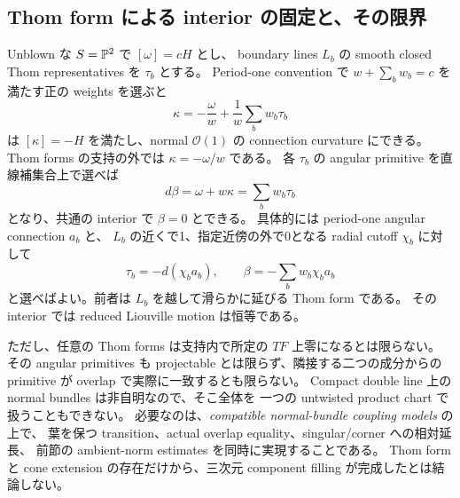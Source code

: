 \subsection{Thom form による interior の固定と、その限界}

Unblown な $S=\mathbb P^2$ で $[\omega]=cH$ とし、
boundary lines $L_b$ の smooth closed Thom representatives を $\tau_b$ とする。
Period-one convention で $w+\sum_bw_b=c$ を満たす正の weights を選ぶと
\[
\kappa=-\frac{\omega}{w}+\frac1w\sum_bw_b\tau_b
\]
は $[\kappa]=-H$ を満たし、normal $\mathcal O(1)$ の connection curvature にできる。
Thom forms の支持の外では $\kappa=-\omega/w$ である。
各 $\tau_b$ の angular primitive を直線補集合上で選べば
\[
d\beta=\omega+w\kappa=\sum_bw_b\tau_b
\]
となり、共通の interior で $\beta=0$ とできる。
具体的には period-one angular connection $a_b$ と、
$L_b$ の近くで1、指定近傍の外で0となる radial cutoff $\chi_b$ に対して
\[
\tau_b=-d(\chi_ba_b),\qquad \beta=-\sum_bw_b\chi_ba_b
\]
と選べばよい。前者は $L_b$ を越して滑らかに延びる Thom form である。
その interior では reduced Liouville motion は恒等である。

ただし、任意の Thom forms は支持内で所定の $TF$ 上零になるとは限らない。
その angular primitives も projectable とは限らず、隣接する二つの成分からの
primitive が overlap で実際に一致するとも限らない。
Compact double line 上の normal bundles は非自明なので、そこ全体を
一つの untwisted product chart で扱うこともできない。
必要なのは、\emph{compatible normal-bundle coupling models} の上で、
葉を保つ transition、actual overlap equality、singular/corner への相対延長、
前節の ambient-norm estimates を同時に実現することである。
Thom form と cone extension の存在だけから、三次元 component filling が完成したとは結論しない。
